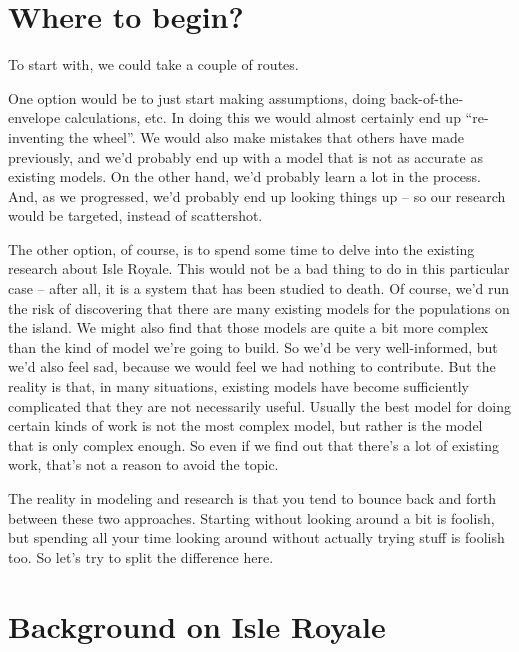 \section{Where to begin?}
To start with, we could take a couple of routes.  

One option would be to just start making assumptions, doing back-of-the-envelope calculations, etc.  In doing this we would almost certainly end up ``re-inventing the wheel''.  We would also make mistakes that others have made previously, and we'd probably end up with a model that is not as accurate as existing models.  On the other hand, we'd probably learn a lot in the process.    And, as we progressed, we'd probably end up looking things up -- so our research would be targeted, instead of scattershot.  

The other option, of course, is to spend some time to delve into the existing research about Isle Royale.  This would not be a bad thing to do in this particular case -- after all, it is a system that has been studied to death.  Of course, we'd run the risk of discovering that there are many existing models for the populations on the island.  We might also find that those models are quite a bit more complex than the kind of model we're going to build.  So we'd be very well-informed, but we'd also feel sad, because we would feel we had nothing to contribute.  But the reality is that, in many situations, existing models have become sufficiently complicated that they are not necessarily useful.  Usually the best model for doing certain kinds of work is not the most complex model, but rather is the model that is only complex enough.  So even if we find out that there's a lot of existing work, that's not a reason to avoid the topic.

The reality in modeling and research is that you tend to bounce back and forth between these two approaches.  Starting without looking around a bit is foolish, but spending all your time looking around without actually trying stuff is foolish too.  So let's try to split the difference here.

\section{Background on Isle Royale}

